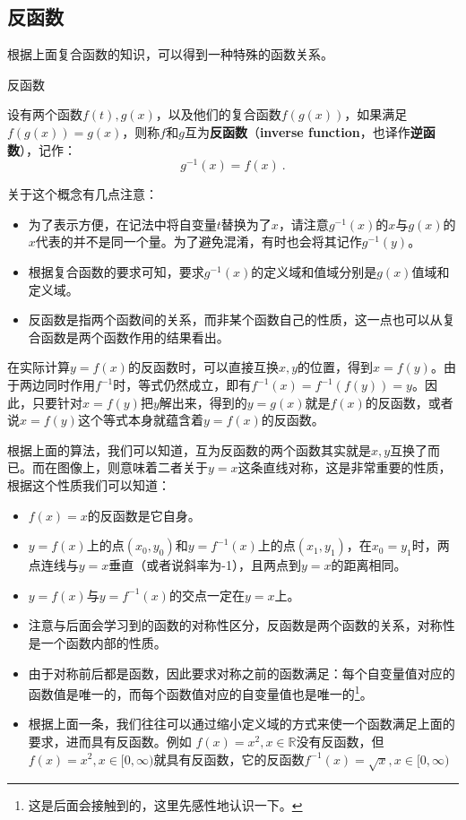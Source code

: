 \subsection{反函数}

根据上面复合函数的知识，可以得到一种特殊的函数关系。

\begin{definition}{反函数}

设有两个函数$f(t),g(x)$，以及他们的复合函数$f(g(x))$，如果满足$f(g(x))=g(x)$，则称$f$和$g$互为\textbf{反函数}（\textbf{inverse function}，也译作\textbf{逆函数}），记作：
\begin{equation}
g^{-1}(x)=f(x)~.
\end{equation}
\end{definition}

关于这个概念有几点注意：
\begin{itemize}
\item 为了表示方便，在记法中将自变量$t$替换为了$x$，请注意$g^{-1}(x)$的$x$与$g(x)$的$x$代表的并不是同一个量。为了避免混淆，有时也会将其记作$g^{-1}(y)$。
\item 根据复合函数的要求可知，要求$g^{-1}(x)$的定义域和值域分别是$g(x)$值域和定义域。
\item 反函数是指两个函数间的关系，而非某个函数自己的性质，这一点也可以从复合函数是两个函数作用的结果看出。
\end{itemize}

在实际计算$y=f(x)$的反函数时，可以直接互换$x,y$的位置，得到$x=f(y)$。由于两边同时作用$f^{-1}$时，等式仍然成立，即有$f^{-1}(x)=f^{-1}(f(y))=y$。因此，只要针对$x=f(y)$把$y$解出来，得到的$y=g(x)$就是$f(x)$的反函数，或者说$x=f(y)$这个等式本身就蕴含着$y=f(x)$的反函数。

根据上面的算法，我们可以知道，互为反函数的两个函数其实就是$x,y$互换了而已。而在图像上，则意味着二者关于$y=x$这条直线对称，这是非常重要的性质，根据这个性质我们可以知道：
\begin{itemize}
\item $f(x)=x$的反函数是它自身。
\item $y=f(x)$上的点$(x_0,y_0)$和$y=f^{-1}(x)$上的点$(x_1,y_1)$，在$x_0=y_1$时，两点连线与$y=x$垂直（或者说斜率为-1），且两点到$y=x$的距离相同。
\item $y=f(x)$与$y=f^{-1}(x)$的交点一定在$y=x$上。
\item 注意与后面会学习到的函数的对称性区分，反函数是两个函数的关系，对称性是一个函数内部的性质。
\item 由于对称前后都是函数，因此要求对称之前的函数满足：每个自变量值对应的函数值是唯一的，而每个函数值对应的自变量值也是唯一的\footnote{这是后面会接触到的，这里先感性地认识一下。}。
\item 根据上面一条，我们往往可以通过缩小定义域的方式来使一个函数满足上面的要求，进而具有反函数。例如 $f(x)=x^2,x\in\mathbb{R}$没有反函数，但$f(x)=x^2,x\in[0,\infty)$就具有反函数，它的反函数$f^{-1}(x)=\sqrt{x},x\in[0,\infty)$
\end{itemize}

